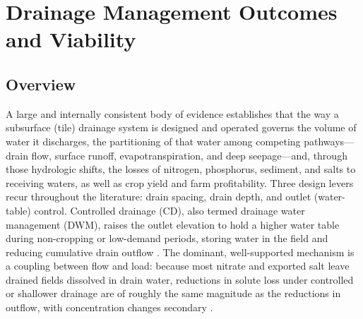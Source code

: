 \documentclass[11pt]{article}
\begin{document}
\section*{Drainage Management Outcomes and Viability}

\subsection{Overview}

A large and internally consistent body of evidence establishes that the way a
subsurface (tile) drainage system is designed and operated governs the volume of
water it discharges, the partitioning of that water among competing
pathways---drain flow, surface runoff, evapotranspiration, and deep
seepage---and, through those hydrologic shifts, the losses of nitrogen,
phosphorus, sediment, and salts to receiving waters, as well as crop yield and
farm profitability. Three design levers recur throughout the literature: drain
spacing, drain depth, and outlet (water-table) control. Controlled drainage
(CD), also termed drainage water management (DWM), raises the outlet elevation
to hold a higher water table during non-cropping or low-demand periods, storing
water in the field and reducing cumulative drain outflow
\parencite{Singh2020,Strock2011,Blann2009}. The dominant, well-supported
mechanism is a coupling between flow and load: because most nitrate and exported
salt leave drained fields dissolved in drain water, reductions in solute loss
under controlled or shallower drainage are of roughly the same magnitude as the
reductions in outflow, with concentration changes secondary
\parencite{Wesström2007,Frankenberger2024,Lalonde1996,Tolomio2018}.
\end{document}
